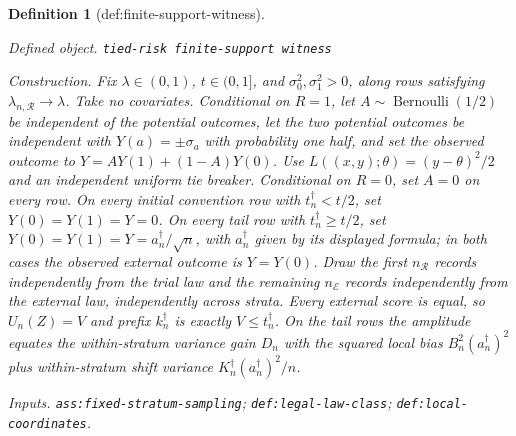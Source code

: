 \documentclass{article}
\newtheorem{definition}{Definition}
\begin{document}
\begin{definition}[def:finite-support-witness]\label{def:finite-support-witness}
\par\smallskip\noindent\emph{Defined object.} \texttt{tied-\allowbreak{}risk finite-\allowbreak{}support witness}
\par\smallskip\noindent\emph{Construction.} Fix \(\lambda\in(0,1)\), \(t\in(0,1]\), and \(\sigma_0^2,\sigma_1^2>0\), along rows satisfying \(\lambda_{n,\mathcal R}\to\lambda\).  Take no covariates.  Conditional on \(R=1\), let \(A\sim\operatorname{Bernoulli}(1/2)\) be independent of the potential outcomes, let the two potential outcomes be independent with \(Y(a)=\pm\sigma_a\) with probability one half, and set the observed outcome to \(Y=AY(1)+(1-A)Y(0)\).  Use \(L((x,y);\theta)=(y-\theta)^2/2\) and an independent uniform tie breaker.  Conditional on \(R=0\), set \(A=0\) on every row.  On every initial convention row with \(t_n^{\dagger}<t/2\), set \(Y(0)=Y(1)=Y=0\).  On every tail row with \(t_n^{\dagger}\geq t/2\), set \(Y(0)=Y(1)=Y=a_n^{\dagger}/\sqrt n\), with \(a_n^{\dagger}\) given by its displayed formula; in both cases the observed external outcome is \(Y=Y(0)\).  Draw the first \(n_{\mathcal R}\) records independently from the trial law and the remaining \(n_{\mathcal E}\) records independently from the external law, independently across strata.  Every external score is equal, so \(U_n(Z)=V\) and prefix \(k_n^{\dagger}\) is exactly \(V\leq t_n^{\dagger}\).  On the tail rows the amplitude equates the within-stratum variance gain \(D_n\) with the squared local bias \(B_n^2(a_n^{\dagger})^2\) plus within-stratum shift variance \(K_n^{\dagger}(a_n^{\dagger})^2/n\).
\par\smallskip\noindent\emph{Inputs.} \texttt{ass:\allowbreak{}fixed-\allowbreak{}stratum-\allowbreak{}sampling}; \texttt{def:\allowbreak{}legal-\allowbreak{}law-\allowbreak{}class}; \texttt{def:\allowbreak{}local-\allowbreak{}coordinates}.
\end{definition}
\end{document}
